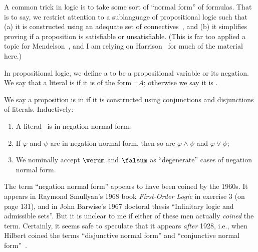 \begin{node}\label{prop-000P}%
A common trick in logic is to take some sort of ``normal form'' of
formulas. That is to say, we restrict attention to a sublanguage of
propositional logic such that (a) it is constructed using an adequate
set of connectives~, and (b) it simplifies proving if a
proposition is satisfiable or unsatisfiable. (This is far too applied a
topic for Mendelson~\cite{mendelson2015mathematical}, and I am relying on
Harrison~\cite{harrison2009handbook} for much of the material here.)

\begin{definition}\label{prop-000Q}%
In propositional logic, we define a  to be a
propositional variable or its negation. We say that a literal is
 if it is of the form $\neg A$; otherwise we say it is
. 
\end{definition}

\begin{definition}\label{prop-000O}%
We say a proposition is in  if it is
constructed using conjunctions and disjunctions of
literals. Inductively:
\begin{enumerate}
\item A literal~ is in negation normal form;
\item If $\varphi$ and $\psi$ are in negation normal form, then so are
  $\varphi\land\psi$ and $\varphi\lor\psi$;
\item We nominally accept $\verum$ and $\falsum$ as ``degenerate'' cases
  of negation normal form.
\end{enumerate}

\begin{node}\label{prop-normal-form-0003}%
The term ``negation normal form'' appears to have been coined by the
1960s. It appears in Raymond Smullyan's 1968 book \textit{First-Order Logic}
in exercise 3 (on page 131), and in John Barwise's 1967 doctoral thesis
``Infinitary logic and admissible sets''. But it is unclear to me if
either of these men actually \emph{coined} the term. Certainly, it seems
safe to speculate that it appears \emph{after} 1928, i.e., when Hilbert
coined the terms ``disjunctive normal form'' and ``conjunctive normal form''~.
\end{node}
\end{definition}


\end{node}

